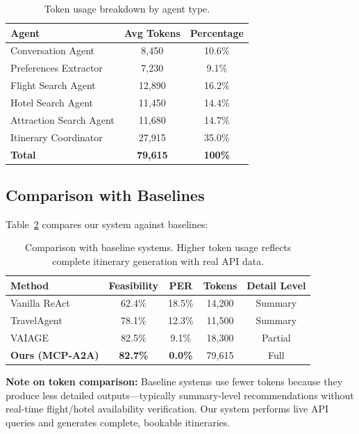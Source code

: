 \documentclass[preprint,review,12pt]{elsarticle}
\begin{document}
\begin{table}[h]
\centering
\caption{Token usage breakdown by agent type.}
\label{tab:token_breakdown}
\begin{tabular}{lcc}
\toprule
\textbf{Agent} & \textbf{Avg Tokens} & \textbf{Percentage} \\
\midrule
Conversation Agent & 8,450 & 10.6\% \\
Preferences Extractor & 7,230 & 9.1\% \\
Flight Search Agent & 12,890 & 16.2\% \\
Hotel Search Agent & 11,450 & 14.4\% \\
Attraction Search Agent & 11,680 & 14.7\% \\
Itinerary Coordinator & 27,915 & 35.0\% \\
\midrule
\textbf{Total} & \textbf{79,615} & \textbf{100\%} \\
\bottomrule
\end{tabular}
\end{table}

\subsection{Comparison with Baselines}

Table~\ref{tab:baseline} compares our system against baselines:

\begin{table}[h]
\centering
\caption{Comparison with baseline systems. Higher token usage reflects complete itinerary generation with real API data.}
\label{tab:baseline}
\begin{tabular}{lcccc}
\toprule
\textbf{Method} & \textbf{Feasibility} & \textbf{PER} & \textbf{Tokens} & \textbf{Detail Level} \\
\midrule
Vanilla ReAct & 62.4\% & 18.5\% & 14,200 & Summary \\
TravelAgent & 78.1\% & 12.3\% & 11,500 & Summary \\
VAIAGE & 82.5\% & 9.1\% & 18,300 & Partial \\
\textbf{Ours (MCP-A2A)} & \textbf{82.7\%} & \textbf{0.0\%} & 79,615 & Full \\
\bottomrule
\end{tabular}
\end{table}

\textbf{Note on token comparison:} Baseline systems use fewer tokens because they produce less detailed outputs---typically summary-level recommendations without real-time flight/hotel availability verification. Our system performs live API queries and generates complete, bookable itineraries.
\end{document}
